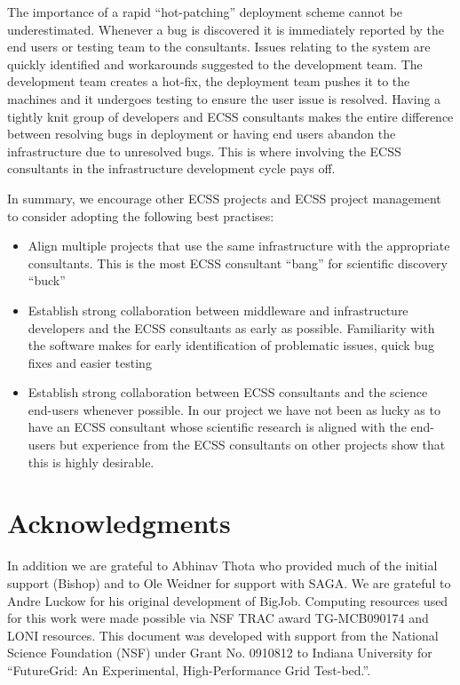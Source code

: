 \documentclass{sig-alternate}
\begin{document}
The importance of a rapid ``hot-patching'' deployment scheme cannot be
underestimated. Whenever a bug is discovered it is immediately
reported by the end users or testing team to the consultants. Issues
relating to the system are quickly identified and workarounds
suggested to the development team. The development team creates a
hot-fix, the deployment team pushes it to the machines and it
undergoes testing to ensure the user issue is resolved. Having a
tightly knit group of developers and ECSS consultants makes the entire
difference between resolving bugs in deployment or having end users
abandon the infrastructure due to unresolved bugs. This is where
involving the ECSS consultants in the infrastructure development cycle
pays off.

In summary, we encourage other ECSS projects and ECSS project
management to consider adopting the following best practises:
\begin{itemize}
 \item Align multiple projects that use the same infrastructure
 with the appropriate consultants. This is the most ECSS consultant
 ``bang'' for scientific discovery ``buck''
 \item Establish strong collaboration between middleware and infrastructure
 developers and the ECSS consultants as early as possible. Familiarity with the software makes for early
 identification of problematic issues, quick bug fixes and easier testing
 \item Establish strong collaboration between ECSS consultants and the science
 end-users whenever possible. In our project we have not been as lucky as to
 have an ECSS consultant whose scientific research is aligned with the end-users
 but experience from the ECSS consultants on other projects show that this is highly
 desirable.
\end{itemize}



\section{Acknowledgments}
In addition we are grateful to Abhinav Thota who provided much of the
initial support (Bishop) and to Ole Weidner for support with SAGA. We
are grateful to Andre Luckow for his original development of BigJob.
Computing resources used for this work were made possible via NSF TRAC
award TG-MCB090174 and LONI resources.  This document was developed
with support from the National Science Foundation (NSF) under Grant
No.  0910812 to Indiana University for ``FutureGrid: An Experimental,
High-Performance Grid Test-bed.''.



\end{document}
